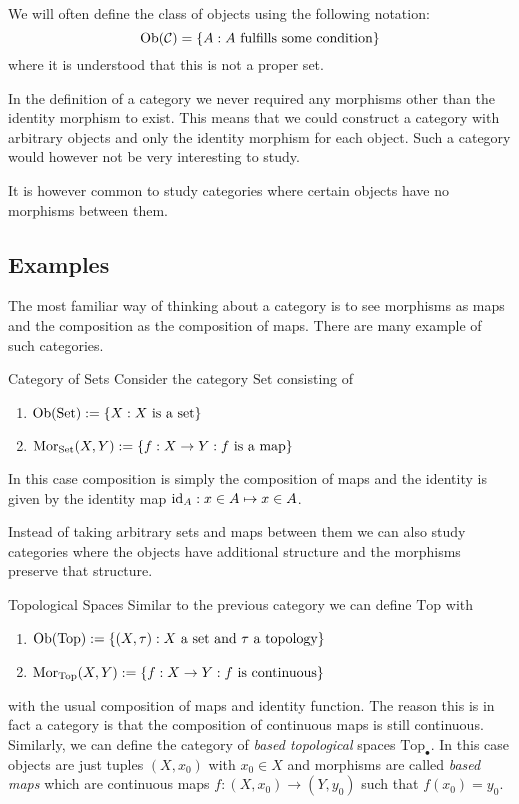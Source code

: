 \begin{notation}{}{}
We will often define the class of objects using the following notation:
\begin{equation*}
    \mathrm {Ob}(\mathcal{C}) = \{A: \text{$A$ fulfills some condition}\}
\end{equation*}
where it is understood that this is not a proper set.
\end{notation}

In the definition of a category we never required any morphisms other than the identity morphism to exist.
This means that we could construct a category with arbitrary objects and only the identity morphism for each object. 
Such a category would however not be very interesting to study.

It is however common to study categories where certain objects have no morphisms between them.

\subsection{Examples}

The most familiar way of thinking about a category is to see morphisms as maps and the composition as the composition of maps. There are many example of such categories.

\begin{example}{Category of Sets}{}
Consider the category $\mathrm{Set}$ consisting of
\begin{enumerate}
    \item $\mathrm {Ob}(\mathrm{Set}) := \{X: \text{$X$ is a set}\}$
    \item $\mathrm {Mor}_{\mathrm{Set}}(X,Y) := \{f: X \to Y: \text{$f$ is a map}\}$
\end{enumerate}
In this case composition is simply the composition of maps and the identity is given by the identity map $\mathrm{id}_A: x \in A \mapsto x \in A$.
\end{example}

Instead of taking arbitrary sets and maps between them we can also study categories where the objects have additional structure and the morphisms preserve that structure.

\begin{example}{Topological Spaces}{}
Similar to the previous category we can define $\mathrm{Top}$ with
\begin{enumerate}
    \item $\mathrm {Ob}(\mathrm{Top}) := \{(X,\tau) : \text{$X$ a set and $\tau$ a topology}\}$
    \item $\mathrm {Mor}_{\mathrm{Top}}(X,Y) := \{f: X \to Y: \text{$f$ is continuous}\}$
\end{enumerate}
with the usual composition of maps and identity function.
The reason this is in fact a category is that the composition of continuous maps is still continuous.\\

Similarly, we can define the category of \emph{based topological} spaces $\mathrm{Top}_\bullet$. In this case objects are just tuples $(X,x_0)$ with $x_0 \in X$ and morphisms are called \emph{based maps} which are continuous maps $f: (X,x_0) \to (Y,y_0)$ such that $f(x_0) = y_0$.
\end{example}

